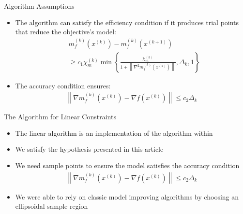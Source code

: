 \documentclass{beamer}
\newcommand{\xk}{{{x}^{(k)}}}
\begin{document}
\begin{frame}{Algorithm Assumptions}
	\begin{itemize}
		\item The algorithm can satisfy the efficiency condition if it produces trial points that reduce the objective's model:
		\begin{align*}
			& m_f^{(k)}\left(\xk\right) - m_f^{(k)}\left(x^{(k+1)}\right) \\
			& \ge c_1 \chi_m^{(k)} \min \left\{
				\frac{\chi_m^{(k)}}{1 + \left\|\nabla^2 m_f^{(k)}\left(x^{(k)}\right)\right\|},
				\Delta_k, 1\right\}
		\end{align*}
		\item The accuracy condition ensures:
		\begin{align*}
			\left\|\nabla m_f^{(k)}\left(x^{(k)}\right) - \nabla f\left(x^{(k)}\right)\right\| \le c_2 \Delta_k
		\end{align*}
	\end{itemize}
\end{frame}


\begin{frame}{The Algorithm for Linear Constraints}
	\begin{itemize}
		\item The linear algorithm is an implementation of the algorithm within \cite{CONEJO2013324}
		\item We satisfy the hypothesis presented in this article
		\item We need sample points to ensure the model satisfies the accuracy condition
\begin{align*}
		\left\|\nabla m_f^{(k)}\left(x^{(k)}\right) - \nabla f \left(x^{(k)}\right)\right\| \le c_2 \Delta_k
\end{align*}
		\item We were able to rely on classic model improving algorithms by choosing an ellipsoidal sample region
	\end{itemize}
\end{frame}
\end{document}
